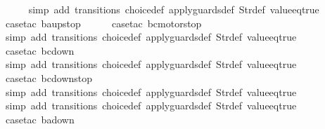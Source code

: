 \begin{isabellebody}
\ \ \ \ \isamarkupfalse%
\ {\isacharparenleft}simp\ add{\isacharcolon}\ transitions\ choice{\isacharunderscore}def\ apply{\isacharunderscore}guards{\isacharunderscore}def\ Str{\isacharunderscore}def\ value{\isacharunderscore}eq{\isacharunderscore}true{\isacharparenright}\isanewline
\ \isamarkupfalse%
\ {\isacharparenleft}case{\isacharunderscore}tac\ {\isachardoublequoteopen}ba{\isacharequal}up{}{}stop{\isachardoublequoteclose}{\isacharparenright}\isanewline
\ \ \ \ \isamarkupfalse%
\ {\isacharparenleft}case{\isacharunderscore}tac\ {\isachardoublequoteopen}bc{\isacharequal}motorstop{}{\isachardoublequoteclose}{\isacharparenright}\isanewline
\ \ \ \ \ \isamarkupfalse%
\ {\isacharparenleft}simp\ add{\isacharcolon}\ transitions\ choice{\isacharunderscore}def\ apply{\isacharunderscore}guards{\isacharunderscore}def\ Str{\isacharunderscore}def\ value{\isacharunderscore}eq{\isacharunderscore}true{\isacharparenright}\isanewline
\ \ \ \ \isamarkupfalse%
\ {\isacharparenleft}case{\isacharunderscore}tac\ {\isachardoublequoteopen}bc{\isacharequal}down{}{}{\isachardoublequoteclose}{\isacharparenright}\isanewline
\ \ \ \ \ \isamarkupfalse%
\ {\isacharparenleft}simp\ add{\isacharcolon}\ transitions\ choice{\isacharunderscore}def\ apply{\isacharunderscore}guards{\isacharunderscore}def\ Str{\isacharunderscore}def\ value{\isacharunderscore}eq{\isacharunderscore}true{\isacharparenright}\isanewline
\ \ \ \ \isamarkupfalse%
\ {\isacharparenleft}case{\isacharunderscore}tac\ {\isachardoublequoteopen}bc{\isacharequal}down{}{}stop{\isachardoublequoteclose}{\isacharparenright}\isanewline
\ \ \ \ \ \isamarkupfalse%
\ {\isacharparenleft}simp\ add{\isacharcolon}\ transitions\ choice{\isacharunderscore}def\ apply{\isacharunderscore}guards{\isacharunderscore}def\ Str{\isacharunderscore}def\ value{\isacharunderscore}eq{\isacharunderscore}true{\isacharparenright}\isanewline
\ \ \isamarkupfalse%
\ {\isacharparenleft}simp\ add{\isacharcolon}\ transitions\ choice{\isacharunderscore}def\ apply{\isacharunderscore}guards{\isacharunderscore}def\ Str{\isacharunderscore}def\ value{\isacharunderscore}eq{\isacharunderscore}true{\isacharparenright}\isanewline
\ \isamarkupfalse%
\ {\isacharparenleft}case{\isacharunderscore}tac\ {\isachardoublequoteopen}ba{\isacharequal}down{}{}{\isachardoublequoteclose}{\isacharparenright}\isanewline

\end{isabellebody}
